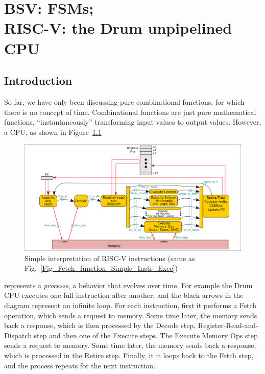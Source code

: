 

\chapter{BSV: FSMs; \\
RISC-V: the Drum unpipelined CPU}


\setcounter{page}{1}
\renewcommand{\thepage}{\arabic{chapter}-\arabic{page}}

\label{ch_Drum_FSMs}


\section{Introduction}

So far, we have only been discussing pure combinational functions, for
which there is no concept of time.  Combinational functions are just
pure mathematical functions, ``instantaneously'' transforming input
values to output values.  However, a CPU, as shown in
Figure~\ref{Fig_Drum_Instr_Exec}
\begin{figure}[htbp]
  \centerline{\includegraphics[width=6in,angle=0]{ch030_RISCV_Design_Space/Figures/Fig_Instr_Exec_w_structs}}
  \caption{\label{Fig_Drum_Instr_Exec}
           Simple interpretation of RISC-V instructions
	   (same as Fig.~\ref{Fig_Fetch_function_Simple_Instr_Exec})}
\end{figure}
represents a \emph{processs}, a behavior that evolves over time.  For
example the Drum CPU executes one full instruction after another, and
the black arrows in the diagram represent an infinite loop. For each
instruction, first it performs a Fetch operation, which sends a
request to memory. Some time later, the memory sends back a response,
which is then processed by the Decode step, Register-Read-and-Dispatch
step and then one of the Execute steps.  The Execute Memory Ops step
sends a request to memory. Some time later, the memory sends back a
response, which is processed in the Retire step.  Finally, it it loops
back to the Fetch step, and the process repeats for the next
instruction.

